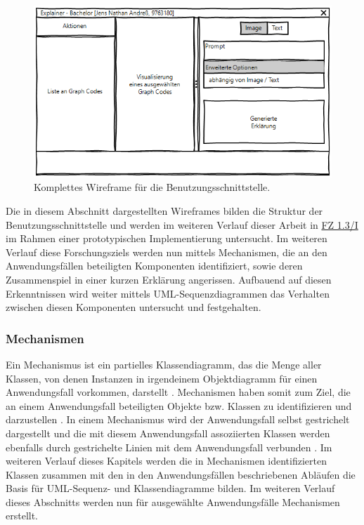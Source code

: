 \begin{figure}[htb]
    \centering
    \includegraphics[width=\textwidth]{chapter/chapter_3/wireframe-complete-stage.png}
    \caption{Komplettes Wireframe für die Benutzungsschnittstelle.}
    \label{sec3:model:par:wireframe:fig:complete-stage}
\end{figure}
Die in diesem Abschnitt dargestellten Wireframes bilden die Struktur der Benutzungsschnittstelle und werden im weiteren Verlauf dieser Arbeit in \hyperref[sec4:impl:subsec:fz-explainability]{FZ 1.3/I} im Rahmen einer prototypischen Implementierung untersucht.
Im weiteren Verlauf diese Forschungsziels werden nun mittels Mechanismen, die an den Anwendungsfällen beteiligten Komponenten identifiziert, sowie deren Zusammenspiel in einer kurzen Erklärung angerissen.
Aufbauend auf diesen Erkenntnissen wird weiter mittels UML-Sequenzdiagrammen das Verhalten zwischen diesen Komponenten untersucht und festgehalten.

\FloatBarrier

\subsubsection{Mechanismen}
\label{sec3:model:par:mechanism-use-cases}
Ein Mechanismus ist ein partielles Klassendiagramm, das die Menge aller Klassen, von denen Instanzen in irgendeinem Objektdiagramm für einen Anwendungsfall vorkommen, darstellt \cite{fuh-func-behavior-uml}.
Mechanismen haben somit zum Ziel, die an einem Anwendungsfall beteiligten Objekte bzw. Klassen zu identifizieren und darzustellen \cite{fuh-func-behavior-uml}.
In einem Mechanismus wird der Anwendungsfall selbst gestrichelt dargestellt und die mit diesem Anwendungsfall assoziierten Klassen werden ebenfalls durch gestrichelte Linien mit dem Anwendungsfall verbunden \cite{fuh-func-behavior-uml}.
Im weiteren Verlauf dieses Kapitels werden die in Mechanismen identifizierten Klassen zusammen mit den in den Anwendungsfällen beschriebenen Abläufen die Basis für UML-Sequenz- und Klassendiagramme bilden.
Im weiteren Verlauf dieses Abschnitts werden nun für ausgewählte Anwendungsfälle Mechanismen erstellt.

